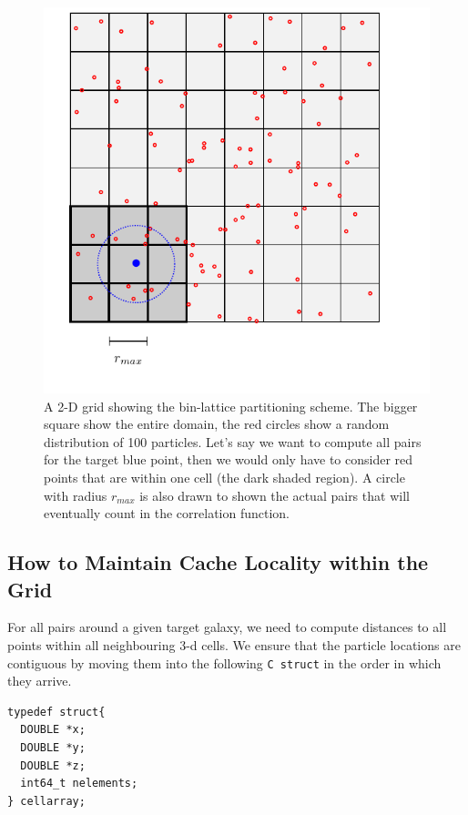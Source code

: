\documentclass[preprint,authoryear,12pt]{elsarticle}
\newcommand{\rmax}{\ensuremath{{r_{max}}}\xspace}
\begin{document}
\begin{figure}[htbp]
\centering
\includegraphics[clip=true]{tikz_grid}
\caption{A 2-D grid showing the bin-lattice partitioning scheme. The bigger square show the entire 
domain, the red circles show a random distribution of 100 particles. Let's say we want to compute all pairs 
for the target blue point, then we would only have to consider red points that are within one cell (the dark shaded region). 
A circle with radius \rmax is also drawn to shown the actual pairs that will eventually count in the correlation function.} 
\end{figure}


\subsection{How to Maintain Cache Locality within the Grid}
For all pairs around a given target galaxy, we need to compute distances to all points within all neighbouring 3-d cells. 
We ensure that the particle locations are contiguous by moving them into the following \texttt{C struct} in the order in which they arrive. 

\begin{lstlisting}
typedef struct{
  DOUBLE *x;
  DOUBLE *y;
  DOUBLE *z;
  int64_t nelements;
} cellarray;
\end{lstlisting}
\end{document}
